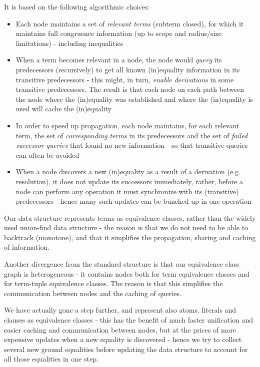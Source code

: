 It is based on the following algorithmic choices:
\begin{itemize}
	\item Each node maintains a set of \emph{relevant terms} (subterm closed), for which it maintains full congruence information (up to scope and radius/size limitations) - including inequalities
	\item When a term becomes relevant in a node, the node would \emph{query} its predecessors (recursively) to get all known (in)equality information in its transitive predecessors - this might, in turn, \emph{enable derivations} in some transitive predecessors. The result is that each node on each path between the node where the (in)equality was established and where the (in)equality is used will cache the (in)equality
	\item In order to speed up propagation, each node maintains, for each relevant term, the set of \emph{corresponding terms} in its predecessors and the set of \emph{failed successor queries} that found no new information - so that transitive queries can often be avoided
	\item When a node discovers a new (in)equality as a result of a derivation (e.g. resolution), it does not update its successors immediately, rather, before a node can perform any operation it must synchronize with its (transitive) predecessors - hence many such updates can be bunched up in one operation
\end{itemize}


Our data structure represents terms as equivalence classes, rather than the widely used union-find data structure - the reason is that we do not need to be able to backtrack (monotone), and that it simplifies the propagation, sharing and caching of information.

Another divergence from the standard structure is that our equivalence class graph is heterogeneous - it contains nodes both for term equivalence classes and for term-tuple equivalence classes. The reason is that this simplifies the communication between nodes and the caching of queries.

We have actually gone a step further, and represent also atoms, literals and clauses as equivalence classes - this has the benefit of much faster unification and easier caching and communication between nodes, but at the prices of more expensive updates when a new equality is discovered - hence we try to collect several new ground equalities before updating the data structure to account for all those equalities in one step.

